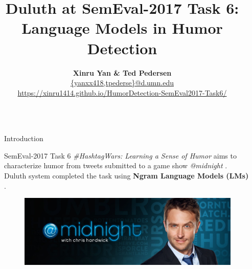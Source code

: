 \documentclass[final]{beamer}
\title{Duluth at SemEval-2017 Task 6: Language Models in Humor Detection} %
\author{\textbf{Xinru Yan \& Ted Pedersen} \\ 
\vspace{4mm}
\normalsize \href{mailto:\{yanxx418,tpederse\}@d.umn.edu}{\{yanxx418,tpederse\}@d.umn.edu} \\
\vspace{4mm} 
\normalsize \href{https://xinru1414.github.io/HumorDetection-SemEval2017-Task6/}{https://xinru1414.github.io/HumorDetection-SemEval2017-Task6/}} %
\institute{Department of Computer Science University of Minnesota Duluth} %
\newlength{\sepwid}
\newlength{\onecolwid}
\begin{document}

\setlength{\belowcaptionskip}{1ex} %
\setlength\belowdisplayshortskip{3ex} %

\begin{frame}[t] %

\begin{columns}[t] %

\begin{column}{\sepwid}\end{column} %

\begin{column}{\onecolwid} %


\begin{block}{Introduction}

SemEval-2017 Task 6 \textit{\#HashtagWars: Learning a Sense of Humor} aims to characterize humor from tweets submitted to a game show \textit{@midnight} \cite{PotashRR17}.
Duluth system completed the task using \textbf{Ngram Language Models (LMs)} \cite{Heafield-estimate}.


\begin{figure}
\includegraphics[width=0.9\linewidth]{@midnight.jpg}
\end{figure}




\end{block}
\end{column}
\end{columns}
\end{frame}
\end{document}
